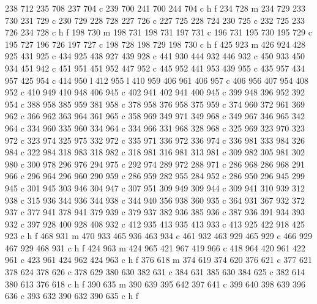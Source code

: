 {{        238 712 235 708 237 704 c
        239 700 241 700 244 704 c
        h f
        234 728 m
        234 729 233 730 231 729 c
        230 729 228 728 227 726 c
        227 725 228 724 230 725 c
        232 725 233 726 234 728 c
        h f
        198 730 m
        198 731 198 731 197 731 c
        196 731 195 730 195 729 c
        195 727 196 726 197 727 c
        198 728 198 729 198 730 c
        h f
        425 923 m
        426 924 428 925 431 925 c
        434 925 438 927 439 928 c
        441 930 444 932 446 932 c
        450 933 450 934 451 942 c
        451 951 451 952 447 952 c
        445 952 441 953 439 955 c
        435 957 434 957 425 954 c
        414 950 l
        412 955 l
        410 959 406 961 406 957 c
        406 956 407 954 408 952 c
        410 949 410 948 406 945 c
        402 941 402 941 400 945 c
        399 948 396 952 392 954 c
        388 958 385 959 381 958 c
        378 958 376 958 375 959 c
        374 960 372 961 369 962 c
        366 962 363 964 361 965 c
        358 969 349 971 349 968 c
        349 967 346 965 342 964 c
        334 960 335 960 334 964 c
        334 966 331 968 328 968 c
        325 969 323 970 323 972 c
        323 974 325 975 332 972 c
        335 971 336 972 336 974 c
        336 981 333 984 326 984 c
        322 984 318 983 318 982 c
        318 981 316 981 313 981 c
        309 982 305 981 302 980 c
        300 978 296 976 294 975 c
        292 974 289 972 288 971 c
        286 968 286 968 291 966 c
        296 964 296 960 290 959 c
        286 959 282 955 284 952 c
        286 950 296 945 299 945 c
        301 945 303 946 304 947 c
        307 951 309 949 309 944 c
        309 941 310 939 312 938 c
        315 936 344 936 344 938 c
        344 940 356 938 360 935 c
        364 931 367 932 372 937 c
        377 941 378 941 379 939 c
        379 937 382 936 385 936 c
        387 936 391 934 393 932 c
        397 928 400 928 408 932 c
        412 935 413 935 413 933 c
        413 925 422 918 425 923 c
        h f
        468 931 m
        470 933 465 936 463 934 c
        461 932 463 929 465 929 c
        466 929 467 929 468 931 c
        h f
        424 963 m
        424 965 421 967 419 966 c
        418 964 420 961 422 961 c
        423 961 424 962 424 963 c
        h f
        376 618 m
        374 619 374 620 376 621 c
        377 621 378 624 378 626 c
        378 629 380 630 382 631 c
        384 631 385 630 384 625 c
        382 614 380 613 376 618 c
        h f
        390 635 m
        390 639 395 642 397 641 c
        399 640 398 639 396 636 c
        393 632 390 632 390 635 c
        h f
}}
